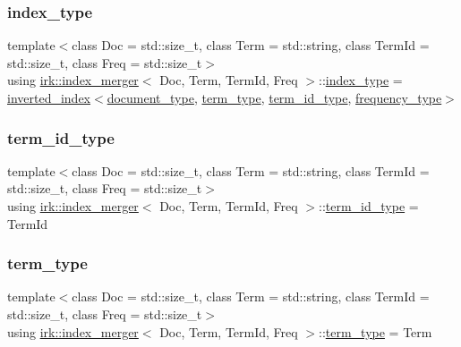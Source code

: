 \subsubsection{\texorpdfstring{index\+\_\+type}{index\_type}}
{\footnotesize\ttfamily template$<$class Doc  = std\+::size\+\_\+t, class Term  = std\+::string, class Term\+Id  = std\+::size\+\_\+t, class Freq  = std\+::size\+\_\+t$>$ \\
using \mbox{\hyperlink{classirk_1_1index__merger}{irk\+::index\+\_\+merger}}$<$ Doc, Term, Term\+Id, Freq $>$\+::\mbox{\hyperlink{classirk_1_1index__merger_ad218976b86b988db7a72b81f67d352b4}{index\+\_\+type}} =  \mbox{\hyperlink{classirk_1_1inverted__index}{inverted\+\_\+index}}$<$\mbox{\hyperlink{classirk_1_1index__merger_ace9b689f5d38f6aeed3ce16f0f1bd260}{document\+\_\+type}}, \mbox{\hyperlink{classirk_1_1index__merger_a2b76203064ec60dc3b0fa662fd8aa3f0}{term\+\_\+type}}, \mbox{\hyperlink{classirk_1_1index__merger_a3731db86b5c514a2dd44555c07abe58e}{term\+\_\+id\+\_\+type}}, \mbox{\hyperlink{classirk_1_1index__merger_a6cb409ab2e737118969206ee9b27d147}{frequency\+\_\+type}}$>$}

\mbox{\label{classirk_1_1index__merger_a3731db86b5c514a2dd44555c07abe58e}} 
\subsubsection{\texorpdfstring{term\+\_\+id\+\_\+type}{term\_id\_type}}
{\footnotesize\ttfamily template$<$class Doc  = std\+::size\+\_\+t, class Term  = std\+::string, class Term\+Id  = std\+::size\+\_\+t, class Freq  = std\+::size\+\_\+t$>$ \\
using \mbox{\hyperlink{classirk_1_1index__merger}{irk\+::index\+\_\+merger}}$<$ Doc, Term, Term\+Id, Freq $>$\+::\mbox{\hyperlink{classirk_1_1index__merger_a3731db86b5c514a2dd44555c07abe58e}{term\+\_\+id\+\_\+type}} =  Term\+Id}

\mbox{\label{classirk_1_1index__merger_a2b76203064ec60dc3b0fa662fd8aa3f0}} 
\subsubsection{\texorpdfstring{term\+\_\+type}{term\_type}}
{\footnotesize\ttfamily template$<$class Doc  = std\+::size\+\_\+t, class Term  = std\+::string, class Term\+Id  = std\+::size\+\_\+t, class Freq  = std\+::size\+\_\+t$>$ \\
using \mbox{\hyperlink{classirk_1_1index__merger}{irk\+::index\+\_\+merger}}$<$ Doc, Term, Term\+Id, Freq $>$\+::\mbox{\hyperlink{classirk_1_1index__merger_a2b76203064ec60dc3b0fa662fd8aa3f0}{term\+\_\+type}} =  Term}



